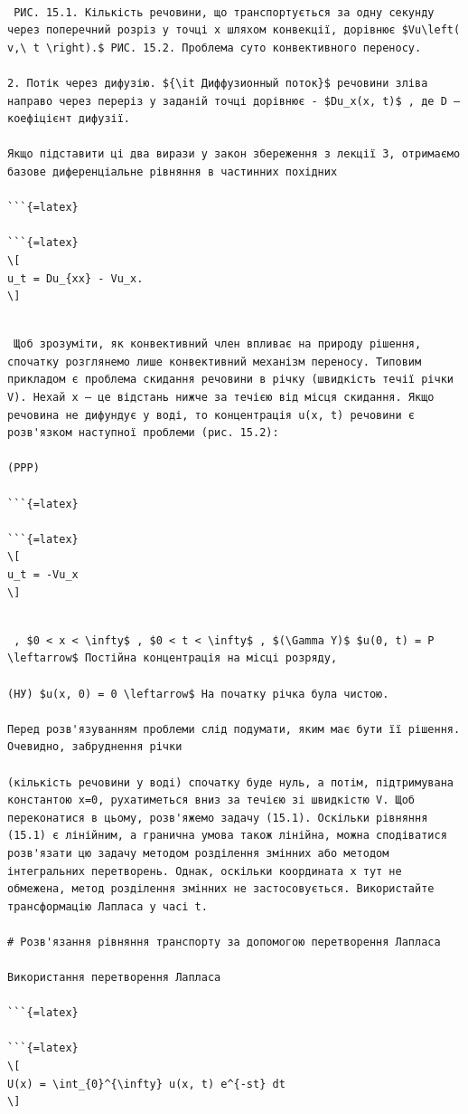 \documentclass[
  ukrainian,
]{article}
\begin{document}
\begin{verbatim}

 РИС. 15.1. Кількість речовини, що транспортується за одну секунду через поперечний розріз у точці x шляхом конвекції, дорівнює $Vu\left( v,\ t \right).$ РИС. 15.2. Проблема суто конвективного переносу.

2. Потік через дифузію. ${\it Диффузионный поток}$ речовини зліва направо через переріз у заданій точці дорівнює - $Du_x(x, t)$ , де D — коефіцієнт дифузії.

Якщо підставити ці два вирази у закон збереження з лекції 3, отримаємо базове диференціальне рівняння в частинних похідних

```{=latex}

```{=latex}
\[
u_t = Du_{xx} - Vu_x.
\]
\end{verbatim}

\begin{verbatim}

 Щоб зрозуміти, як конвективний член впливає на природу рішення, спочатку розглянемо лише конвективний механізм переносу. Типовим прикладом є проблема скидання речовини в річку (швидкість течії річки V). Нехай x — це відстань нижче за течією від місця скидання. Якщо речовина не дифундує у воді, то концентрація u(x, t) речовини є розв'язком наступної проблеми (рис. 15.2):

(PPP)

```{=latex}

```{=latex}
\[
u_t = -Vu_x
\]
\end{verbatim}

\begin{verbatim}

 , $0 < x < \infty$ , $0 < t < \infty$ , $(\Gamma Y)$ $u(0, t) = P \leftarrow$ Постійна концентрація на місці розряду,

(НУ) $u(x, 0) = 0 \leftarrow$ На початку річка була чистою.

Перед розв'язуванням проблеми слід подумати, яким має бути її рішення. Очевидно, забруднення річки

(кількість речовини у воді) спочатку буде нуль, а потім, підтримувана константою x=0, рухатиметься вниз за течією зі швидкістю V. Щоб переконатися в цьому, розв'яжемо задачу (15.1). Оскільки рівняння (15.1) є лінійним, а гранична умова також лінійна, можна сподіватися розв'язати цю задачу методом розділення змінних або методом інтегральних перетворень. Однак, оскільки координата x тут не обмежена, метод розділення змінних не застосовується. Використайте трансформацію Лапласа у часі t.

# Розв'язання рівняння транспорту за допомогою перетворення Лапласа

Використання перетворення Лапласа

```{=latex}

```{=latex}
\[
U(x) = \int_{0}^{\infty} u(x, t) e^{-st} dt
\]
\end{verbatim}
\end{document}
